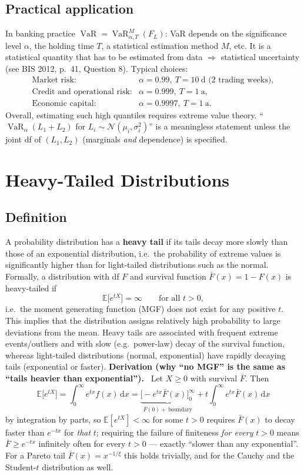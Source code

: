 \documentclass[11pt,a4paper]{article}
\newcommand{\VaR}{\operatorname{VaR}}
\newcommand{\E}{\mathbb{E}}
\newcommand{\N}{\mathcal{N}}
\newcommand{\dd}{\,\mathrm{d}}
\newcommand{\der}[1]{\medskip\noindent\textbf{Derivation (#1).}\ }
\begin{document}
\subsection{Practical application}
In banking practice $\VaR=\VaR^M_{\alpha,T}(F_L)$: VaR depends on the significance level $\alpha$, the
holding time $T$, a statistical estimation method $M$, etc. It is a statistical quantity that has to
be estimated from data $\Rightarrow$ statistical uncertainty (see BIS 2012, p.\ 41, Question 8).
Typical choices:
\[
\begin{array}{ll}
  \text{Market risk:} & \alpha=0.99,\ T=10\ \text{d (2 trading weeks)},\\
  \text{Credit and operational risk:} & \alpha=0.999,\ T=1\ \text{a},\\
  \text{Economic capital:} & \alpha=0.9997,\ T=1\ \text{a}.
\end{array}
\]
Overall, estimating such high quantiles requires extreme value theory.
``$\VaR_\alpha(L_1+L_2)$ for $L_i\sim \N(\mu_i,\sigma_i^2)$'' is a meaningless statement unless the
joint df of $(L_1,L_2)$ (marginals \emph{and} dependence) is specified.

\section{Heavy-Tailed Distributions}

\subsection{Definition}
A probability distribution has a \textbf{heavy tail} if its tails decay more slowly than those of an
exponential distribution, i.e.\ the probability of extreme values is significantly higher than for
light-tailed distributions such as the normal. Formally, a distribution with df $F$ and survival
function $\bar F(x)=1-F(x)$ is heavy-tailed if
\[
  \E\big[e^{tX}\big]=\infty\qquad\text{for all }t>0,
\]
i.e.\ the moment generating function (MGF) does not exist for any positive $t$. This implies that the
distribution assigns relatively high probability to large deviations from the mean. Heavy tails are
associated with frequent extreme events/outliers and with slow (e.g.\ power-law) decay of the
survival function, whereas light-tailed distributions (normal, exponential) have rapidly decaying
tails (exponential or faster).
\der{why ``no MGF'' is the same as ``tails heavier than exponential''}
Let $X\ge0$ with survival $\bar F$. Then
\[
  \E\big[e^{tX}\big]=\int_0^\infty e^{tx}f(x)\dd x
    =\underbrace{\big[-e^{tx}\bar F(x)\big]_0^\infty}_{\bar F(0)+\ \text{boundary}}
     +t\int_0^\infty e^{tx}\bar F(x)\dd x
\]
by integration by parts, so $\E[e^{tX}]<\infty$ for some $t>0$ requires $\bar F(x)$ to decay faster
than $e^{-tx}$ for \emph{that} $t$; requiring the failure of finiteness \emph{for every} $t>0$ means
$\bar F\ge e^{-tx}$ infinitely often for every $t>0$ --- exactly ``slower than any exponential''.
For a Pareto tail $\bar F(x)=x^{-1/\xi}$ this holds trivially, and for the Cauchy and the Student-$t$
distribution as well.
\end{document}
